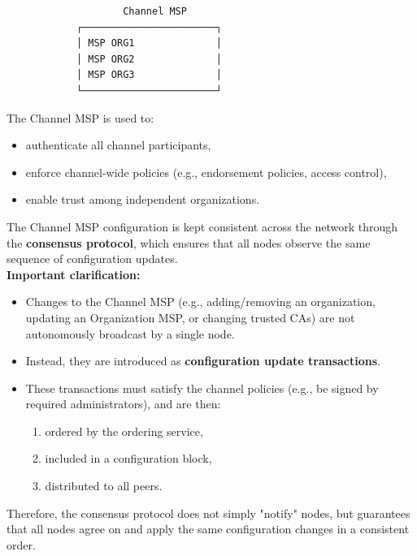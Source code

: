 \documentclass{scrbook}
\begin{document}
\begin{itemize}
\begin{enumerate}
        \begin{center}
        \begin{verbatim}
                    Channel MSP
            ┌───────────────────────┐
            │ MSP ORG1              │
            │ MSP ORG2              │
            │ MSP ORG3              │
            └───────────────────────┘
        \end{verbatim}
        \end{center}
    
        The Channel MSP is used to:
        \begin{itemize}
            \item authenticate all channel participants,
            \item enforce channel-wide policies (e.g., endorsement policies, access control),
            \item enable trust among independent organizations.
        \end{itemize}
    
        The Channel MSP configuration is kept consistent across the network through the \textbf{consensus protocol}, which ensures that all nodes observe the same sequence of configuration updates.\\
    
        \textbf{Important clarification:}
        \begin{itemize}
            \item Changes to the Channel MSP (e.g., adding/removing an organization, updating an Organization MSP, or changing trusted CAs) are not autonomously broadcast by a single node.
            \item Instead, they are introduced as \textbf{configuration update transactions}.
            \item These transactions must satisfy the channel policies (e.g., be signed by required administrators), and are then:
            \begin{enumerate}
                \item ordered by the ordering service,
                \item included in a configuration block,
                \item distributed to all peers.
            \end{enumerate}
        \end{itemize}
    
        Therefore, the consensus protocol does not simply "notify" nodes, but guarantees that all nodes agree on and apply the same configuration changes in a consistent order.
    
    \end{enumerate}

\end{itemize}
\end{document}
